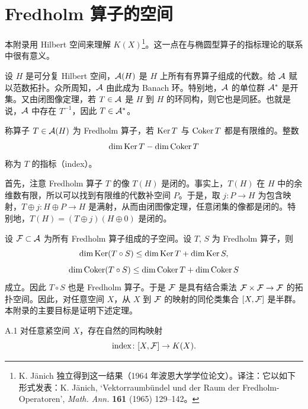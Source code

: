 \chapter{Fredholm 算子的空间}

本附录用 Hilbert 空间来理解 $K(X)$\footnote{K. Jänich 独立得到这一结果（1964 年波恩大学学位论文）。译注：它以如下形式发表：K. Jänich, ‘Vektorraumbündel und der Raum der Fredholm-Operatoren’, \textit{Math. Ann.} \textbf{161} (1965) 129--142。}。这一点在与椭圆型算子的指标理论的联系中很有意义。

设 $H$ 是可分复 Hilbert 空间，$\mathcal{A}(H)$ 是 $H$ 上所有有界算子组成的代数。给 $\mathcal{A}$ 赋以范数拓扑。众所周知，$\mathcal{A}$ 由此成为 Banach 环。特别地，$\mathcal{A}$ 的单位群 $\mathcal{A}^*$ 是开集。又由闭图像定理，若 $T\in\mathcal{A}$ 是 $H$ 到 $H$ 的环同构，则它也是同胚。也就是说，$\mathcal{A}$ 中存在 $T^{-1}$，因此 $T\in\mathcal{A}^*$。

\begin{definition}{}
  称算子 $T\in\mathcal{A}(H)$ 为 Fredholm 算子，若 $\operatorname{Ker} T$ 与 $\operatorname{Coker} T$ 都是有限维的。整数
  \[
    \dim\operatorname{Ker} T-\dim\operatorname{Coker} T
  \]
  称为 $T$ 的指标（index）。
\end{definition}


首先，注意 Fredholm 算子 $T$ 的像 $T(H)$ 是闭的。事实上，$T(H)$ 在 $H$ 中的余维数有限，所以可以找到有限维的代数补空间 $P$。于是，取 $j\colon P\to H$ 为包含映射，$T\oplus j\colon H\oplus P\to H$ 是满射，从而由闭图像定理，任意闭集的像都是闭的。特别地，$T(H)=(T\oplus j)(H\oplus0)$ 是闭的。

设 $\mathcal{F}\subset\mathcal{A}$ 为所有 Fredholm 算子组成的子空间。设 $T$, $S$ 为 Fredholm 算子，则
\[
  \dim\operatorname{Ker}(T\circ S)\le\dim\operatorname{Ker} T+\dim\operatorname{Ker} S,
\]
\[
  \dim\operatorname{Coker}(T\circ S)\le\dim\operatorname{Coker} T+\dim\operatorname{Coker} S
\]
成立。因此 $T\circ S$ 也是 Fredholm 算子。于是 $\mathcal{F}$ 是具有结合乘法 $\mathcal{F}\times\mathcal{F}\to\mathcal{F}$ 的拓扑空间。因此，对任意空间 $X$，从 $X$ 到 $\mathcal{F}$ 的映射的同伦类集合 $[X,\mathcal{F}]$ 是半群。本附录的主要目标是证明下述定理。

\begin{theorem*}{A.1}
  对任意紧空间 $X$，存在自然的同构映射
  \[
    \operatorname{index}\colon[X,\mathcal{F}]\to K(X).
  \]
\end{theorem*}

